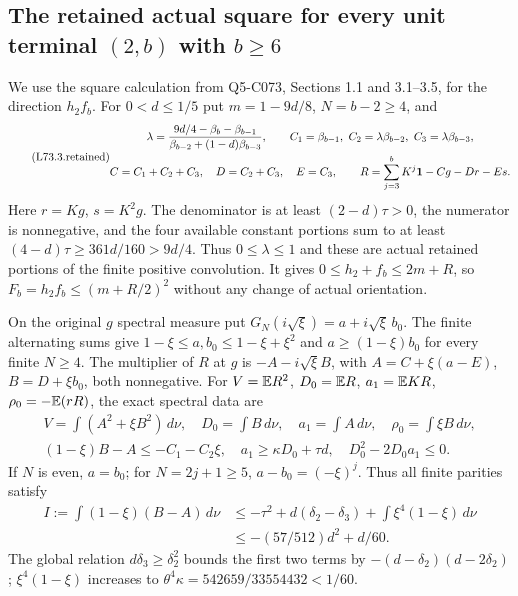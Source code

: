 \subsection{The retained actual square for every unit terminal $(2,b)$ with $b\ge6$}\label{proof:Q5-C073}
We use the square calculation from Q5-C073, Sections 1.1 and
3.1--3.5, for the direction $h_2f_b$.
For $0<d\le1/5$ put $m=1-9d/8$, $N=b-2\ge4$, and
\begin{equation}\tag{L73.3.retained}\label{eq:L73:retained}
\begin{gathered}
\lambda=\frac{9d/4-\beta_b-\beta_{b-1}}
{\beta_{b-2}+(1-d)\beta_{b-3}},\qquad
C_1=\beta_{b-1},\ C_2=\lambda\beta_{b-2},\ C_3=\lambda\beta_{b-3},\\
C=C_1+C_2+C_3,\quad D=C_2+C_3,\quad E=C_3,\qquad
R=\sum_{j=3}^bK^j\mathbf1-Cg-Dr-Es.
\end{gathered}
\end{equation}
Here $r=Kg$, $s=K^2g$. The denominator is at least
$(2-d)\tau>0$, the numerator is nonnegative, and the four available
constant portions sum to at least
$(4-d)\tau\ge361d/160>9d/4$. Thus $0\le\lambda\le1$ and these
are actual retained portions of the finite positive convolution.
It gives $0\le h_2+f_b\le2m+R$, so
$F_b=h_2f_b\le(m+R/2)^2$ without any change of actual orientation.

On the original $g$ spectral measure put
$G_N(i\sqrt\xi)=a+i\sqrt\xi\,b_0$.
The finite alternating sums give
$1-\xi\le a,b_0\le1-\xi+\xi^2$ and
$a\ge(1-\xi)b_0$ for every finite $N\ge4$.
The multiplier of $R$ at $g$ is $-A-i\sqrt\xi B$, with
$A=C+\xi(a-E)$, $B=D+\xi b_0$, both nonnegative.
For $V=\mathbb E R^2$, $D_0=\mathbb E R$, $a_1=\mathbb E KR$,
$\rho_0=-\mathbb E(rR)$, the exact spectral data are
\begin{equation}\tag{L73.3.1}\label{eq:L73:spectral}
\begin{gathered}
V=\int(A^2+\xi B^2)\,d\nu,\quad D_0=\int B\,d\nu,
\quad a_1=\int A\,d\nu,\quad\rho_0=\int\xi B\,d\nu,\\
(1-\xi)B-A\le-C_1-C_2\xi,\quad
a_1\ge\kappa D_0+\tau d,\quad D_0^2-2D_0a_1\le0.
\end{gathered}
\end{equation}
If $N$ is even, $a=b_0$; for $N=2j+1\ge5$,
$a-b_0=(-\xi)^j$. Thus all finite parities satisfy
\begin{align*}
I:=\int(1-\xi)(B-A)\,d\nu
&\le-\tau^2+d(\delta_2-\delta_3)
+\int\xi^4(1-\xi)\,d\nu\\
&\le-(57/512)d^2+d/60.
\end{align*}
The global relation $d\delta_3\ge\delta_2^2$ bounds the first two
terms by $-(d-\delta_2)(d-2\delta_2)$;
$\xi^4(1-\xi)$ increases to
$\theta^4\kappa=542659/33554432<1/60$.

